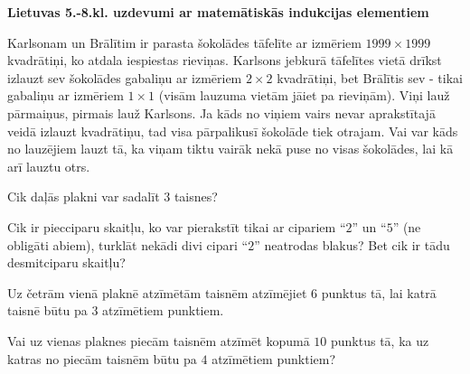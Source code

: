 \documentclass[11pt]{article}
\begin{document}
\begin{center}
{\Large \bf Lietuvas 5.-8.kl. uzdevumi ar matemātiskās indukcijas elementiem}
\end{center}

\begin{problem}[LT.58.1999.5to7.4]
Karlsonam un Brālītim ir parasta šokolādes tāfelīte ar izmēriem $1999 \times 1999$ kvadrātiņi, 
ko atdala iespiestas rieviņas. Karlsons jebkurā tāfelītes vietā drīkst izlauzt sev
šokolādes gabaliņu ar izmēriem $2 \times 2$ kvadrātiņi, 
bet Brālītis sev - tikai gabaliņu ar izmēriem $1 \times 1$ (visām lauzuma vietām 
jāiet pa rieviņām). Viņi lauž pārmaiņus, pirmais lauž Karlsons. 
Ja kāds no viņiem vairs nevar aprakstītajā veidā izlauzt kvadrātiņu, tad
visa pārpalikusī šokolāde tiek otrajam. Vai var kāds no lauzējiem lauzt tā, 
ka viņam tiktu vairāk nekā puse no visas šokolādes, lai kā arī lauztu otrs. 
\end{problem}


\begin{problem}[LT.58.2000.5to7.4]
Cik daļās plakni var sadalīt $3$ taisnes?
\end{problem}


\begin{problem}[LT.58.2003.7to8.1]
Cik ir piecciparu skaitļu, ko var pierakstīt tikai ar cipariem ``$2$'' un ``$5$''
(ne obligāti abiem), turklāt nekādi divi cipari ``$2$'' neatrodas blakus? 
Bet cik ir tādu desmitciparu skaitļu?
\end{problem}

\begin{problem}[LT.58.2005.5to6.2]
Uz četrām vienā plaknē atzīmētām taisnēm atzīmējiet $6$ punktus tā, lai 
katrā taisnē būtu pa $3$ atzīmētiem punktiem.
\end{problem}

\begin{problem}[LT.58.2005.5to6.1]
Vai uz vienas plaknes piecām taisnēm atzīmēt kopumā $10$ punktus tā, 
ka uz katras no piecām taisnēm būtu pa $4$ atzīmētiem punktiem? 
\end{problem}
\end{document}
